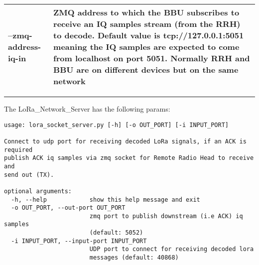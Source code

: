 \begin{longtable}[]{@{}ll@{}}
\begin{minipage}[t]{0.18\columnwidth}\raggedright\strut
--zmq-address-iq-in\strut
\end{minipage} & \begin{minipage}[t]{0.18\columnwidth}\raggedright\strut
ZMQ address to which the BBU subscribes to receive an IQ samples stream
(from the RRH) to decode. Default value is tcp://127.0.0.1:5051 meaning
the IQ samples are expected to come from localhost on port 5051.
Normally RRH and BBU are on different devices but on the same
network\strut
\end{minipage}\tabularnewline
\bottomrule
\end{longtable}

\begin{center}\rule{0.5\linewidth}{\linethickness}\end{center}

The LoRa\_Network\_Server has the following params:

\begin{verbatim}
usage: lora_socket_server.py [-h] [-o OUT_PORT] [-i INPUT_PORT]

Connect to udp port for receiving decoded LoRa signals, if an ACK is required
publish ACK iq samples via zmq socket for Remote Radio Head to receive and
send out (TX).

optional arguments:
  -h, --help            show this help message and exit
  -o OUT_PORT, --out-port OUT_PORT
                        zmq port to publish downstream (i.e ACK) iq samples
                        (default: 5052)
  -i INPUT_PORT, --input-port INPUT_PORT
                        UDP port to connect for receiving decoded lora
                        messages (default: 40868)

\end{verbatim}

